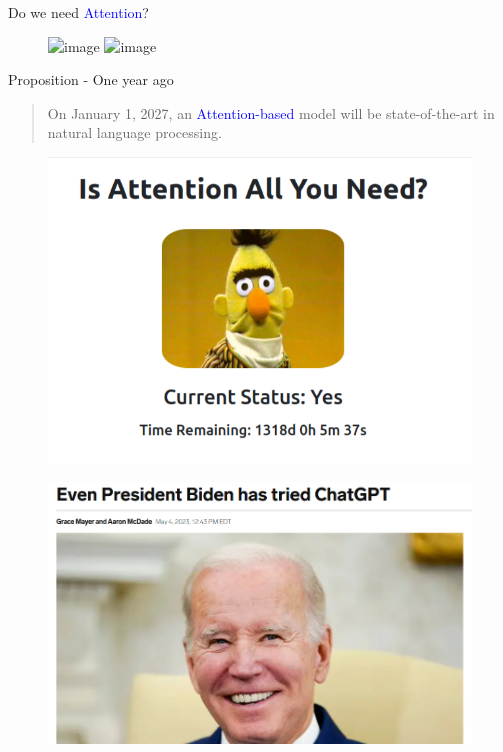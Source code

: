 \begin{frame}{Do we need \textcolor{blue}{Attention}?}
    \centering
    \begin{figure}
        \centering
        
        \includegraphics<1>[height=0.6\textheight,clip,trim={0.1cm 0.1cm 0.1cm 0.1cm}]{Figs/Complex.png} 
        \includegraphics<2>[height=0.55\textheight,clip,trim={0.1cm 0.1cm 0.1cm 0.1cm}]{Figs/Allowed.png}
        
        
    \end{figure}
\end{frame}

\begin{frame}[label=current]{Proposition - One year ago}
    \begin{quote}
        On January 1, 2027, an \textcolor{blue}{Attention-based} model will be state-of-the-art in natural language processing.
    \end{quote}

    \begin{figure}
        \centering
        \includegraphics[width=0.7\linewidth,clip,  trim={0.1cm 0.1cm 0.1cm 0.1cm}]{Figs/Is-Attention-All-You-Need-.png}
        \label{fig:my_label}
    \end{figure}

\end{frame}


\begin{frame}[c, label=current]{}
    \begin{figure}
        \centering
    \includegraphics[width=0.8\linewidth]{Figs/Biden.png}
        \label{fig:my_label}
    \end{figure}
\end{frame}



